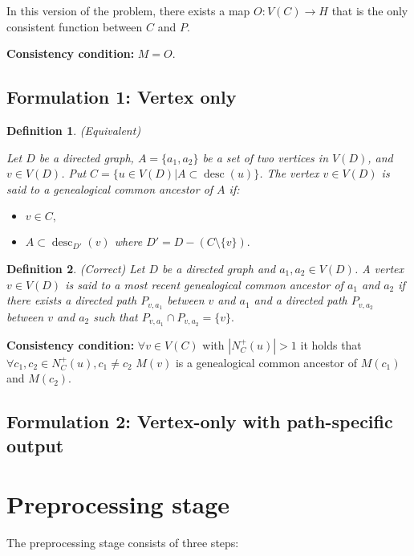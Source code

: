 \documentclass[14pt]{extarticle}
\DeclareMathOperator{\desc}{desc}
\newtheorem{definition}{Definition}
\begin{document}
 

In this version of the problem, there exists a map $O: V(C) \rightarrow H$ that is the only consistent function between $C$ and $P$.

\textbf{Consistency condition:}  $M = O$.

\subsection{Formulation 1: Vertex only} 

\begin{definition} (Equivalent)
	
	Let $D$ be a directed graph, $A = \{a_1,  a_2\}$ be a set of two vertices in $V(D)$, and $v \in V(D)$. Put $C = \{u \in V(D) | A \subset \desc(u) \}$. The vertex $v \in V(D)$ is said to a genealogical common ancestor of $A$ if:
	
	\begin{itemize}
		\item 
		$v \in C,$
		\item 
		$A \subset \desc_{D'}(v)$ where $D' = D -  (C \setminus \{v\}).$
	\end{itemize}
	
\end{definition}

\begin{definition} (Correct)
	Let $D$ be a directed graph and $a_1, a_2 \in V(D)$. A vertex $v \in V(D)$ is said to a most recent genealogical common ancestor of $a_1$ and $a_2$ if there exists 
	a directed path $P_{v,a_1}$ between $v$ and $a_1$ and a directed path $P_{v,a_2}$ between $v$ and $a_2$ such that $P_{v,a_1} \cap P_{v,a_2} = \{v\}.$	
\end{definition}

\textbf{Consistency condition:}  $\forall v \in V(C)$ with $|N^{+}_C(u)| > 1$ it holds that $\forall c_1, c_2 \in N^{+}_C(u), c_1 \ne c_2$ $M(v)$ is a genealogical common ancestor of $M(c_1)$ and $M(c_2)$.


\subsection{Formulation 2: Vertex-only with path-specific output}

\section{Preprocessing stage}

The preprocessing stage consists of three steps:
\end{document}
